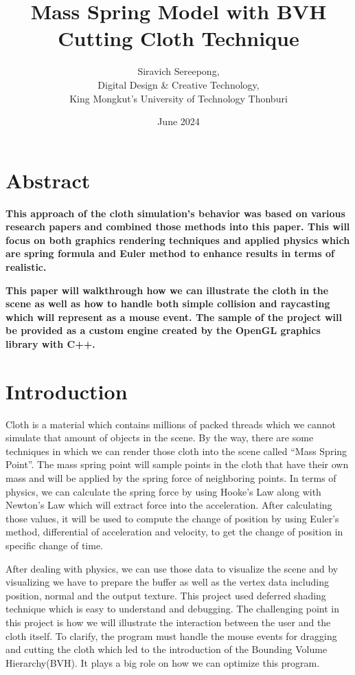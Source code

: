 \documentclass{article}
\title{\textbf{Mass Spring Model with BVH Cutting Cloth Technique}}
\author{Siravich Sereepong, \\ 
Digital Design \& Creative Technology, \\
King Mongkut's University of Technology Thonburi}
\date{June 2024}
\begin{document}
\maketitle

\begin{multicols}{2}
\section*{Abstract}
\textbf{\indent This approach of the cloth simulation's behavior was based on various research papers and combined those methods into this paper. This will focus on both graphics rendering techniques and applied physics which are spring formula and Euler method to enhance results in terms of realistic.}

\textbf{\indent This paper will walkthrough how we can illustrate the cloth in the scene as well as how to handle both simple collision and raycasting which will represent as a mouse event. The sample of the project will be provided as a custom engine created by the OpenGL graphics library with C++.}

\section{Introduction}
\indent \indent Cloth is a material which contains millions of packed threads which we cannot simulate that amount of objects in the scene. By the way, there are some techniques in which we can render those cloth into the scene called ``Mass Spring Point''. The mass spring point will sample points in the cloth that have their own mass and will be applied by the spring force of neighboring points.
In terms of physics, we can calculate the spring force by using Hooke's Law along with Newton's Law which will extract force into the acceleration. After calculating those values, it will be used to compute the change of position by using Euler's method, differential of acceleration and velocity, to get the change of position in specific change of time.

\indent After dealing with physics, we can use those data to visualize the scene and by visualizing we have to prepare the buffer as well as the vertex data including position, normal and the output texture. This project used deferred shading technique which is easy to understand and debugging. The challenging point in this project is how we will illustrate the interaction between the user and the cloth itself. To clarify, the program must handle the mouse events for dragging and cutting the cloth which led to the introduction of the Bounding Volume Hierarchy(BVH). It plays a big role on how we can optimize this program.


\end{multicols}
\end{document}
